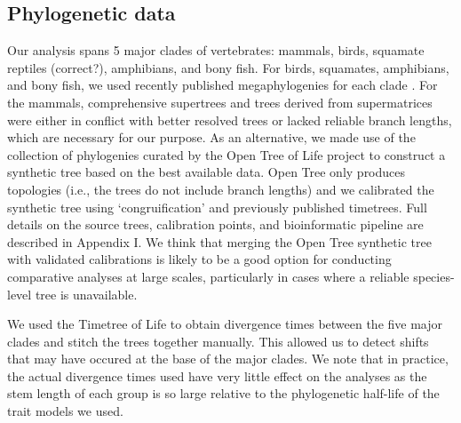 \documentclass[a4paper,11pt]{article}
\begin{document}
\subsection*{Phylogenetic data}
Our analysis spans 5 major clades of vertebrates: mammals, birds, squamate reptiles (correct?), amphibians, and bony fish. For birds, squamates, amphibians, and bony fish, we used recently published megaphylogenies for each clade \citep[][respectively]{Jetz2012, Pyron2014, Pyronamph, Rabosky2012}. For the mammals, comprehensive supertrees \citep{Binindaemonds2007} and trees derived from supermatrices \citep{Faurby2015} were either in conflict with better resolved trees \citep[e.g.,][]{Meredith2011} or lacked reliable branch lengths, which are necessary for our purpose. As an alternative, we made use of the collection of phylogenies curated by the Open Tree of Life project \citep{OpenTree} to construct a synthetic tree based on the best available data. Open Tree only produces topologies (i.e., the trees do not include branch lengths) and we calibrated the synthetic tree using `congruification' \citep{EastmanCongruify} and previously published timetrees. Full details on the source trees, calibration points, and bioinformatic pipeline are described in Appendix I. We think that merging the Open Tree synthetic tree with validated calibrations is likely to be a good option for conducting comparative analyses at large scales, particularly in cases where a reliable species-level tree is unavailable.

We used the Timetree of Life \citep{Hedgestimetree} to obtain divergence times between the five major clades and stitch the trees together manually. This allowed us to detect shifts that may have occured at the base of the major clades. We note that in practice, the actual divergence times used have very little effect on the analyses as the stem length of each group is so large relative to the phylogenetic half-life \citep{HansenOrzack1997} of the trait models we used.

\end{document}
